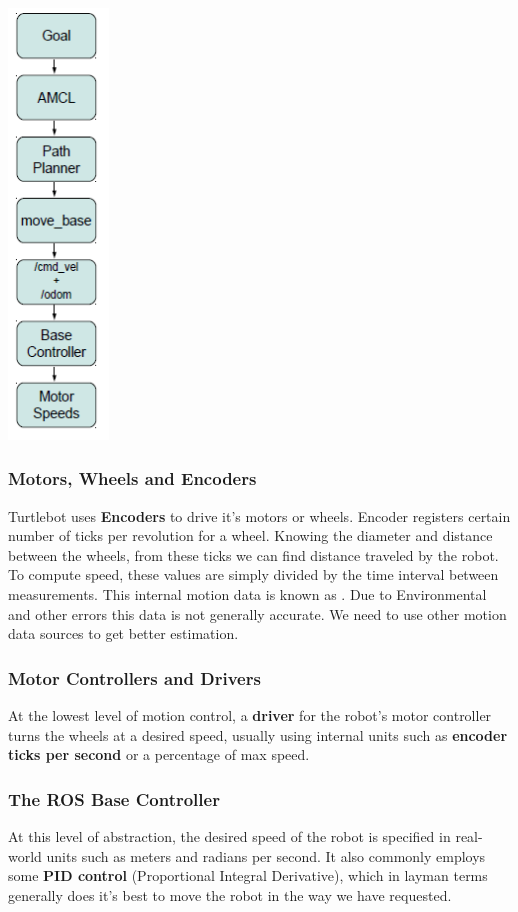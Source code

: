 \documentclass[10pt,a4paper]{article}
\begin{document}
\begin{center}
\includegraphics[width=0.2\textwidth]{images/motion_control.png}\\
\end{center}

\subsubsection{Motors, Wheels and Encoders}
Turtlebot uses \textbf{Encoders} to drive it's motors or wheels. Encoder registers certain number of ticks per revolution for a wheel. Knowing the diameter and distance between the wheels, from these ticks we can find distance traveled by the robot. To compute speed, these values are simply divided by the time interval between measurements.
This internal motion data is known as . Due to Environmental and other errors this data is not generally accurate. We need to use other motion data sources to get better estimation.

\subsubsection{Motor Controllers and Drivers}
At the lowest level of motion control, a \textbf{driver }for the robot's motor controller turns the wheels at a desired speed, usually using internal units such as \textbf{encoder ticks per second} or a percentage of max speed.

\subsubsection{The ROS Base Controller}
At this level of abstraction, the desired speed of the robot is specified in real-world units such as meters and radians per second. It also commonly employs some \textbf{PID control }(Proportional Integral Derivative), which in layman terms generally does it's best to move the robot in the way we have requested. 
\end{document}
